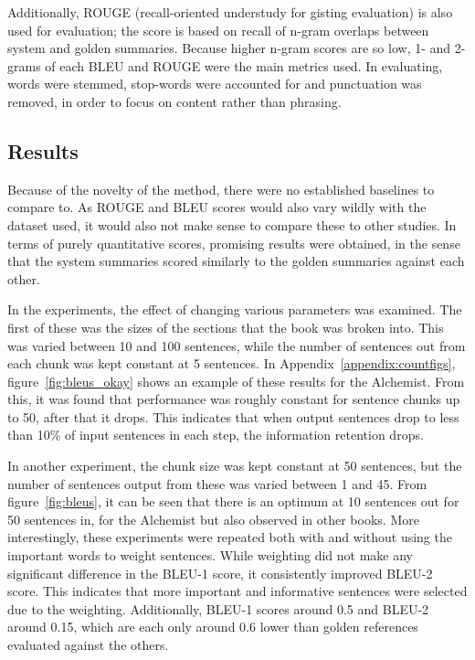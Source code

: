 Additionally, ROUGE (recall-oriented understudy for gisting evaluation) is also
used for evaluation; the score is based on recall of n-gram overlaps between
system and golden summaries. Because higher n-gram scores are so low, 1- and 2-
grams of each BLEU and ROUGE were the main metrics used. In evaluating, words
were stemmed, stop-words were accounted for and punctuation was removed, in
order to focus on content rather than phrasing.

\subsection{Results}
Because of the novelty of the method, there were no established baselines to
compare to. As ROUGE and BLEU scores would also vary wildly with the dataset
used, it would also not make sense to compare these to other studies. In terms
of purely quantitative scores, promising results were obtained, in the sense
that the system summaries scored similarly to the golden summaries against each
other.

In the experiments, the effect of changing various parameters was examined. The
first of these was the sizes of the sections that the book was broken into.
This was varied between 10 and 100 sentences, while the number of sentences out
from each chunk was kept constant at 5 sentences. In
Appendix~\ref{appendix:countfigs}, figure~\ref{fig:bleus_okay} shows an example of these
results for the Alchemist. From this, it was found that performance was roughly
constant for sentence chunks up to 50, after that it drops. This indicates that
when output sentences drop to less than 10\% of input sentences in each step,
the information retention drops.

In another experiment, the chunk size was kept constant at 50 sentences, but
the number of sentences output from these was varied between 1 and 45. From
figure~\ref{fig:bleus}, it can be seen that there is an optimum at 10 sentences
out for 50 sentences in, for the Alchemist but also observed in other books.
More interestingly, these experiments were repeated both with and without using
the important words to weight sentences. While weighting did not make any
significant difference in the BLEU-1 score, it consistently improved BLEU-2
score. This indicates that more important and informative sentences were
selected due to the weighting. Additionally, BLEU-1 scores around 0.5 and
BLEU-2 around 0.15, which are each only around 0.6 lower than golden references
evaluated against the others.

